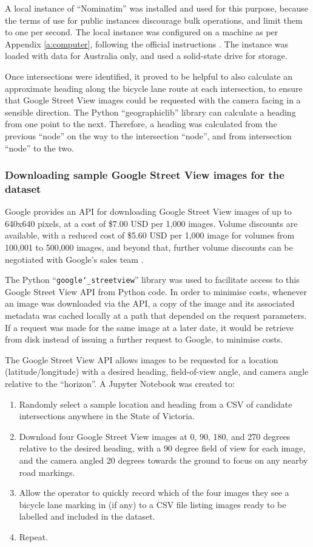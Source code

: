 \documentclass[11pt,twoside]{report}
\begin{document}
A local instance of ``Nominatim'' was installed and used for this purpose, because the terms of use for public instances discourage bulk operations, and limit them to one per second.  The local instance was configured on a machine as per Appendix \ref{a:computer}, following the official instructions \cite{nominatim_install}.  The instance was loaded with data for Australia only, and used a solid-state drive for storage.

Once intersections were identified, it proved to be helpful to also calculate an approximate heading along the bicycle lane route at each intersection, to ensure that Google Street View images could be requested with the camera facing in a sensible direction.  The Python ``geographiclib'' library can calculate a heading from one point to the next.  Therefore, a heading was calculated from the previous ``node'' on the way to the intersection ``node'', and from intersection ``node'' to the two.


\subsubsection{Downloading sample Google Street View images for the dataset}
\label{s:sample}

Google provides an API for downloading Google Street View images of up to 640x640 pixels, at a cost of \$7.00 USD per 1,000 images.  Volume discounts are available, with a reduced cost of \$5.60 USD per 1,000 image for volumes from 100,001 to 500,000 images, and beyond that, further volume discounts can be negotiated with Google's sales team \cite{gsv_billing}.

The Python ``\texttt{google\char`_streetview}'' library was used to facilitate access to this Google Street View API from Python code.  In order to minimise costs, whenever an image was downloaded via the API, a copy of the image and its associated metadata was cached locally at a path that depended on the request parameters.  If a request was made for the same image at a later date, it would be retrieve from disk instead of issuing a further request to Google, to minimise costs.

The Google Street View API allows images to be requested for a location (latitude/longitude) with a desired heading, field-of-view angle, and camera angle relative to the ``horizon''.  A Jupyter Notebook was created to:

\begin{enumerate}
	\item{Randomly select a sample location and heading from a CSV of candidate intersections anywhere in the State of Victoria.}
	\item{Download four Google Street View images at 0, 90, 180, and 270 degrees relative to the desired heading, with a 90 degree field of view for each image, and the camera angled 20 degrees towards the ground to focus on any nearby road markings.}
	\item{Allow the operator to quickly record which of the four images they see a bicycle lane marking in (if any) to a CSV file listing images ready to be labelled and included in the dataset.}
	\item{Repeat.}
\end{enumerate}
\end{document}
